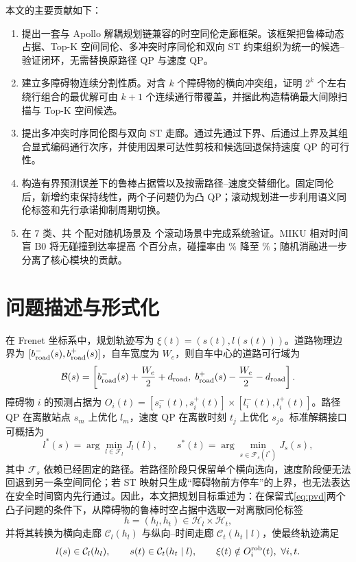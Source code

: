 本文的主要贡献如下：
\begin{enumerate}[leftmargin=2em]
  \item 提出一套与 Apollo 解耦规划链兼容的时空同伦走廊框架。该框架把鲁棒动态占据、Top-K 空间同伦、多冲突时序同伦和双向 ST 约束组织为统一的候选--验证闭环，无需替换原路径 QP 与速度 QP。
  \item 建立多障碍物连续分割性质。对含 $k$ 个障碍物的横向冲突组，证明 $2^k$ 个左右绕行组合的最优解可由 $k+1$ 个连续通行带覆盖，并据此构造精确最大间隙扫描与 Top-K 空间候选。
  \item 提出多冲突时序同伦图与双向 ST 走廊。通过先通过下界、后通过上界及其组合显式编码通行次序，并使用因果可达性剪枝和候选回退保持速度 QP 的可行性。
  \item 构造有界预测误差下的鲁棒占据管以及按需路径--速度交替细化。固定同伦后，新增约束保持线性，两个子问题仍为凸 QP；滚动规划进一步利用语义同伦标签和先行承诺抑制周期切换。
  \item 在 7 类、共 \RandCaseCount 个配对随机场景及 \ClosedCaseCount 个滚动场景中完成系统验证。MIKU 相对时间盲 B0 将无碰撞到达率提高 \RandAllMikuVsBZeroSuccessDiff 个百分点，碰撞率由 \RandAllBZeroCollisionPct\% 降至 \RandAllMikuCollisionPct\%；随机消融进一步分离了核心模块的贡献。
\end{enumerate}

\section{问题描述与形式化}
\label{sec:problem}

在 Frenet 坐标系中，规划轨迹写为 $\xi(t)=(s(t),l(s(t)))$。道路物理边界为 $[b^-_{\rm road}(s),b^+_{\rm road}(s)]$，自车宽度为 $W_e$，则自车中心的道路可行域为
\begin{equation}
 \mathcal B(s)=\left[b^-_{\rm road}(s)+\frac{W_e}{2}+d_{\rm road},\;
 b^+_{\rm road}(s)-\frac{W_e}{2}-d_{\rm road}\right].
 \label{eq:center-road}
\end{equation}
障碍物 $i$ 的预测占据为 $O_i(t)=[s_i^-(t),s_i^+(t)]\times[l_i^-(t),l_i^+(t)]$。路径 QP 在离散站点 $s_m$ 上优化 $l_m$，速度 QP 在离散时刻 $t_j$ 上优化 $s_j$。标准解耦接口可概括为
\begin{equation}
 l^*(s)=\arg\min_{l\in\mathcal F_l}J_l(l),\qquad
 s^*(t)=\arg\min_{s\in\mathcal F_s(l^*)}J_s(s),
 \label{eq:pvd}
\end{equation}
其中 $\mathcal F_s$ 依赖已经固定的路径。若路径阶段只保留单个横向选向，速度阶段便无法回退到另一条空间同伦；若 ST 映射只生成“障碍物前方停车”的上界，也无法表达在安全时间窗内先行通过。因此，本文把规划目标重述为：在保留式\eqref{eq:pvd}两个凸子问题的条件下，从障碍物的鲁棒时空占据中选取一对离散同伦标签
\begin{equation}
 h=(h_l,h_t)\in\mathcal H_l\times\mathcal H_t,
\end{equation}
并将其转换为横向走廊 $\mathcal C_l(h_l)$ 与纵向--时间走廊 $\mathcal C_t(h_t\mid l)$，使最终轨迹满足
\begin{equation}
 l(s)\in\mathcal C_l(h_l),\qquad s(t)\in\mathcal C_t(h_t\mid l),
 \qquad \xi(t)\notin O_i^{\rm rob}(t),\ \forall i,t.
 \label{eq:target}
\end{equation}

